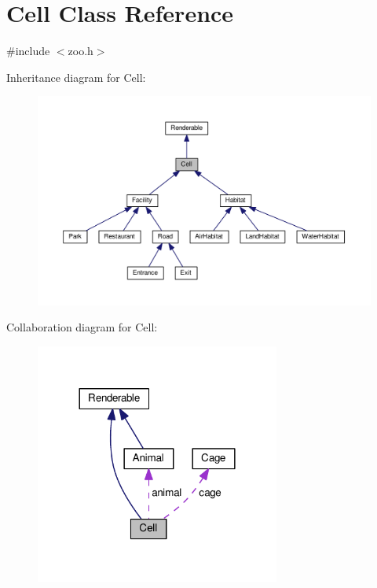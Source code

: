 \hypertarget{classCell}{}\section{Cell Class Reference}
\label{classCell}


{\ttfamily \#include $<$zoo.\+h$>$}



Inheritance diagram for Cell\+:
\nopagebreak
\begin{figure}[H]
\begin{center}
\leavevmode
\includegraphics[width=350pt]{classCell__inherit__graph}
\end{center}
\end{figure}


Collaboration diagram for Cell\+:
\nopagebreak
\begin{figure}[H]
\begin{center}
\leavevmode
\includegraphics[width=228pt]{classCell__coll__graph}
\end{center}
\end{figure}
